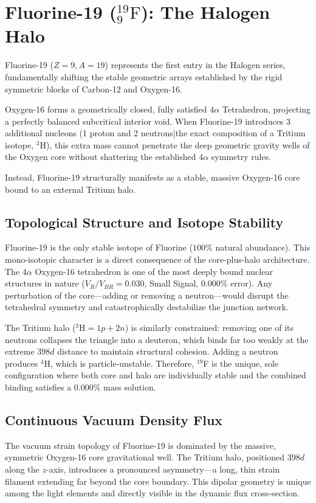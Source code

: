 \chapter{Fluorine-19 ($^{19}_{9}\text{F}$): The Halogen Halo}
\label{ch:fluorine}

Fluorine-19 ($Z=9, A=19$) represents the first entry in the Halogen series, fundamentally shifting the stable geometric arrays established by the rigid symmetric blocks of Carbon-12 and Oxygen-16.

Oxygen-16 forms a geometrically closed, fully satisfied $4\alpha$ Tetrahedron, projecting a perfectly balanced subcritical interior void. When Fluorine-19 introduces 3 additional nucleons (1 proton and 2 neutrons|the exact composition of a Tritium isotope, $^3\text{H}$), this extra mass cannot penetrate the deep geometric gravity wells of the Oxygen core without shattering the established $4\alpha$ symmetry rules.

Instead, Fluorine-19 structurally manifests as a stable, massive Oxygen-16 core bound to an external Tritium halo.

\section{Topological Structure and Isotope Stability}
Fluorine-19 is the only stable isotope of Fluorine ($100\%$ natural abundance). This mono-isotopic character is a direct consequence of the core-plus-halo architecture. The $4\alpha$ Oxygen-16 tetrahedron is one of the most deeply bound nuclear structures in nature ($V_R/V_{BR} = 0.030$, Small Signal, $0.000\%$ error). Any perturbation of the core---adding or removing a neutron---would disrupt the tetrahedral symmetry and catastrophically destabilize the junction network.

The Tritium halo ($^3\text{H} = 1p + 2n$) is similarly constrained: removing one of its neutrons collapses the triangle into a deuteron, which binds far too weakly at the extreme $398d$ distance to maintain structural cohesion. Adding a neutron produces $^4\text{H}$, which is particle-unstable. Therefore, $^{19}$F is the unique, sole configuration where both core and halo are individually stable and the combined binding satisfies a $0.000\%$ mass solution.

\section{Continuous Vacuum Density Flux}
The vacuum strain topology of Fluorine-19 is dominated by the massive, symmetric Oxygen-16 core gravitational well. The Tritium halo, positioned $398d$ along the $z$-axis, introduces a pronounced asymmetry---a long, thin strain filament extending far beyond the core boundary. This dipolar geometry is unique among the light elements and directly visible in the dynamic flux cross-section.

